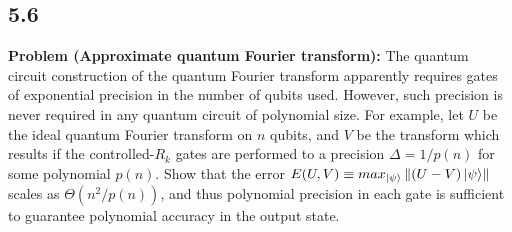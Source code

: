 \documentclass{article}
\begin{document}
\subsection*{5.6}
\textbf{Problem (Approximate quantum Fourier transform):} The quantum circuit construction of the quantum Fourier transform apparently requires gates of exponential precision in the number of qubits used. However, such precision is never required in any quantum circuit of polynomial size. For example, let $U$ be the ideal quantum Fourier transform on $n$ qubits, and $V$ be the transform which results if the controlled-$R_k$ gates are performed to a precision $\Delta = 1/p(n)$ for some polynomial $p(n)$. Show that the error $E(U, V) \equiv max_{\ket{\psi}} \left\|(U - V)\ket{\psi}\right\|$ scales as $\Theta(n^2/p(n))$, and thus polynomial precision in each gate is sufficient to guarantee polynomial accuracy in the output state.
\end{document}
